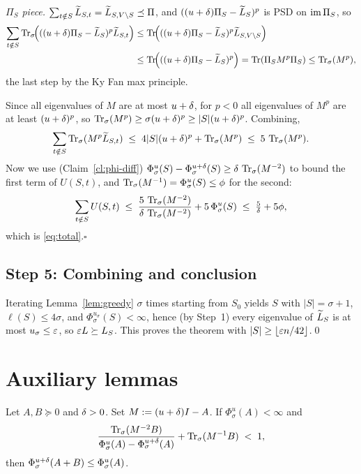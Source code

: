 \documentclass[11pt]{article}
\begin{document}
\smallskip
\emph{$\Pi_S$ piece.}\quad
$\sum_{t\notin S}\widetilde{L}_{S,t}=\widetilde{L}_{S,V\setminus S}\preceq\Pi$, and
$((u+\delta)\Pi_S-\widetilde{L}_S)^p$ is PSD on $\operatorname{im}\Pi_S$, so
\[
\begin{aligned}
\sum_{t\notin S}\operatorname{Tr}_{\sigma}\!\Bigl(((u+\delta)\Pi_S-\widetilde{L}_S)^p\widetilde{L}_{S,t}\Bigr)
  &\le \operatorname{Tr}\!\Bigl(((u+\delta)\Pi_S-\widetilde{L}_S)^p\widetilde{L}_{S,V\setminus S}\Bigr)\\
  &\le \operatorname{Tr}\!\Bigl(((u+\delta)\Pi_S-\widetilde{L}_S)^p\Bigr)
   = \operatorname{Tr}(\Pi_S M^p\Pi_S) \le \operatorname{Tr}_{\sigma}(M^p),
\end{aligned}
\]
the last step by the Ky Fan max principle.

\smallskip
Since all eigenvalues of $M$ are at most $u+\delta$, for $p<0$ all eigenvalues of
$M^p$ are at least $(u+\delta)^p$, so $\operatorname{Tr}_{\sigma}(M^p)\ge\sigma(u+\delta)^p\ge|S|(u+\delta)^p$.
Combining,
\[
  \sum_{t\notin S}\operatorname{Tr}_{\sigma}(M^p\widetilde{L}_{S,t}) \;\le\; 4|S|(u+\delta)^p + \operatorname{Tr}_{\sigma}(M^p)
   \;\le\; 5\,\operatorname{Tr}_{\sigma}(M^p).
\]
Now we use (Claim~\ref{cl:phi-diff})
$\Phi^u_\sigma(S)-\Phi^{u+\delta}_\sigma(S)\ge\delta\,\operatorname{Tr}_{\sigma}(M^{-2})$ to bound the
first term of $U(S,t)$, and $\operatorname{Tr}_{\sigma}(M^{-1})=\Phi^u_\sigma(S)\le\phi$ for the
second:
\[
  \sum_{t\notin S}U(S,t)
   \;\le\; \frac{5\,\operatorname{Tr}_{\sigma}(M^{-2})}{\delta\,\operatorname{Tr}_{\sigma}(M^{-2})} + 5\,\Phi^u_\sigma(S)
   \;\le\; \tfrac{5}{\delta}+5\phi,
\]
which is \eqref{eq:total}.\hfill$\square$

\subsection*{Step 5: Combining and conclusion}

Iterating Lemma~\ref{lem:greedy} $\sigma$ times starting from $S_0$ yields
$S$ with $|S|=\sigma+1$, $\ell(S)\le 4\sigma$, and
$\Phi^{u_\sigma}_\sigma(S)<\infty$, hence (by Step~1) every eigenvalue of
$\widetilde{L}_S$ is at most $u_\sigma\le\varepsilon$, so $\varepsilon L\succeq L_S$. This proves the
theorem with $|S|\ge\lfloor\varepsilon n/42\rfloor$.\qed

\section*{Auxiliary lemmas}

\begin{qsixlemma}\label{lem:bu}
Let $A,B\succeq 0$ and $\delta>0$. Set $M:=(u+\delta)I-A$. If
$\Phi^u_\sigma(A)<\infty$ and
\[
  \frac{\operatorname{Tr}_{\sigma}(M^{-2}B)}{\Phi^u_\sigma(A)-\Phi^{u+\delta}_\sigma(A)}
   + \operatorname{Tr}_{\sigma}(M^{-1}B) \;<\; 1,
\]
then $\Phi^{u+\delta}_\sigma(A+B)\le\Phi^u_\sigma(A)$.
\end{qsixlemma}
\end{document}
